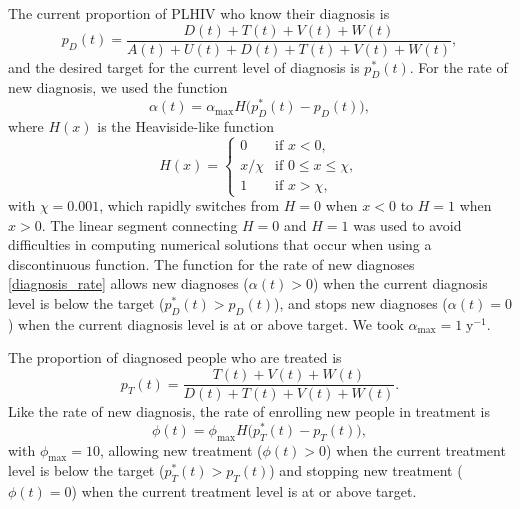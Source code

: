 \documentclass{article}
\begin{document}
The current proportion of PLHIV who know their diagnosis is
\begin{equation}
  p_D(t) = \frac{D(t) + T(t) + V(t) + W(t)}
  {A(t) + U(t) + D(t) + T(t) + V(t) + W(t)},
\end{equation}
and the desired target for the current level of diagnosis is
$p_D^*(t)$.  For the rate of new diagnosis, we used the function
\begin{equation}
  \label{diagnosis_rate}
  \alpha(t) = \alpha_{\max} H\big(p_D^*(t) - p_D(t)\big),
\end{equation}
where $H(x)$ is the Heaviside-like function
\begin{equation}
  H(x) =
  \begin{cases}
    0 & \text{if $x < 0$},
    \\
    x / \chi & \text{if $0 \leq x \leq \chi$},
    \\
    1 & \text{if $x > \chi$},
  \end{cases}
\end{equation}
with $\chi = 0.001$, which rapidly switches from $H = 0$ when $x < 0$
to $H = 1$ when $x > 0$.  The linear segment connecting $H = 0$ and
$H = 1$ was used to avoid difficulties in computing numerical
solutions that occur when using a discontinuous function.  The
function for the rate of new diagnoses \eqref{diagnosis_rate} allows
new diagnoses ($\alpha(t) > 0$) when the current diagnosis level is
below the target ($p_D^*(t) > p_D(t)$), and stops new
diagnoses ($\alpha(t) = 0$) when the current diagnosis level is at or
above target.  We took $\alpha_{\max} = 1\;\text{y$^{-1}$}$.

The proportion of diagnosed people who are treated is
\begin{equation}
  p_T(t) = \frac{T(t) + V(t) + W(t)}{D(t) + T(t) + V(t) + W(t)}.
\end{equation}
Like the rate of new diagnosis, the rate of enrolling new people in
treatment is
\begin{equation}
  \label{treatment_rate}
  \phi(t) = \phi_{\max} H\big(p_T^*(t) - p_T(t)\big),
\end{equation}
with $\phi_{\max} = 10$, allowing new treatment ($\phi(t) > 0$) when
the current treatment level is below the target ($p_T^*(t) > p_T(t)$)
and stopping new treatment ($\phi(t) = 0$) when the current treatment
level is at or above target.
\end{document}
